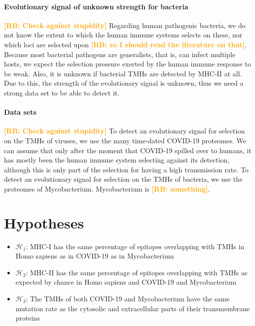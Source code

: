 \documentclass{article}
\newcommand{\richel}[1]{\textcolor{orange}{\textbf{[RB: #1]}}}
\begin{document}
\paragraph{Evolutionary signal of unknown strength for bacteria}

\richel{Check against stupidity}
Regarding human pathogenic bacteria, we do not know the extent to which the 
human immune systems selects on these, nor which loci are selected
upon \richel{so I should read the literature on that}.
Because most bacterial pathogens are generalists, that is,
can infect multiple hosts, we expect the selection pressure exerted
by the human immune response to be weak.
Also, it is unknown if bacterial TMHs are detected by MHC-II at all.
Due to this, the strength of the evolutionary signal is unknown,
thus we need a strong data set to be able to detect it.

\paragraph{Data sets}

\richel{Check against stupidity}
To detect an evolutionary signal for selection on the TMHs of viruses, 
we use the many time-dated COVID-19 proteomes.
We can assume that only after the moment that COVID-19 spilled over 
to humans, it has mostly been the human immune system selecting against
its detection, although this is only part of the selection for 
having a high transmission rate.
To detect an evolutionary signal for selection on the TMHs of bacteria, 
we use the proteomes of Mycobacterium. Mycobacterium is \richel{something}.


\section{Hypotheses}

\begin{itemize}
  \item $\mathcal{H}_1$: MHC-I has the same percentage of epitopes overlapping
    with TMHs in Homo sapiens as in COVID-19 as in Mycobacterium
  \item $\mathcal{H}_2$: MHC-II has the same percentage of epitopes overlapping
    with TMHs as expected by chance in Homo sapiens and COVID-19 and Mycobacterium
  \item $\mathcal{H}_3$: The TMHs of both COVID-19 and Mycobacterium
    have the same mutation rate 
    as the cytosolic and extracellular parts of their transmembrane proteins
\end{itemize}
\end{document}
